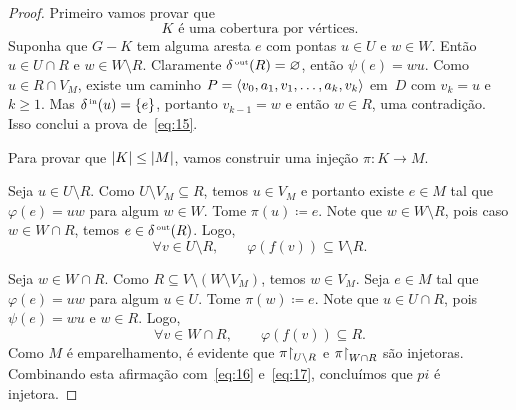 \documentclass[10pt,reqno]{amsart}
\begin{document}
\begin{proof}
  Primeiro vamos provar que
  \begin{equation}
    \label{eq:15}
    \text{\(K\) é uma cobertura por vértices.}
  \end{equation}
  Suponha que \(G - K\) tem alguma aresta \(e\) com pontas \(u \in U\)
  e \(w \in W\).  Então \(u \in U \cap R\) e \(w \in W \setminus R\).
  Claramente \(\delta_{}^{\scriptscriptstyle \rm\, out}(R) = \varnothing\), então \(\psi(e) = wu\).
  Como \(u \in R \cap V_M\), existe um caminho
  \(P = \langle v_0,a_1,v_1,\dotsc, a_k,v_k\rangle\) em~\(D\) com \(v_k = u\) e
  \(k \geq 1\).  Mas \(\delta_{}^{\scriptscriptstyle \rm\, in}(u) = \{e\}\), portanto
  \(v_{k-1} = w\) e então \(w \in R\), uma contradição.  Isso conclui
  a prova de~\eqref{eq:15}.

  Para provar que \(\lvert K\rvert \leq \lvert M\rvert\), vamos construir uma
  injeção \(\pi \colon K \to M\).

  Seja \(u \in U \setminus R\).  Como \(U \setminus V_M \subseteq R\),
  temos \(u \in V_M\) e portanto existe \(e \in M\) tal que
  \(\varphi(e) = uw\) para algum \(w \in W\).  Tome
  \(\pi(u) \coloneqq e\).  Note que \(w \in W \setminus R\), pois caso
  \(w \in W \cap R\), temos \(e \in \delta_{}^{\scriptscriptstyle \rm\, out}(R)\).  Logo,
  \begin{equation}
    \label{eq:16}
    \forall v \in U \setminus R,
    \qquad
    \varphi(f(v)) \subseteq V \setminus R.
  \end{equation}

  Seja \(w \in W \cap R\).  Como
  \(R \subseteq V \setminus (W \setminus V_M)\), temos \(w \in V_M\).
  Seja \(e \in M\) tal que \(\varphi(e) = uw\) para algum \(u \in U\).
  Tome \(\pi(w) \coloneqq e\).  Note que \(u \in U \cap R\), pois
  \(\psi(e) = wu\) e \(w \in R\).  Logo,
  \begin{equation}
    \label{eq:17}
    \forall v \in W \cap R,
    \qquad
    \varphi(f(v)) \subseteq R.
  \end{equation}
  Como \(M\) é emparelhamento, é evidente que
  \(\pi\mathord{\restriction}_{U \setminus R}\) e \(\pi\mathord{\restriction}_{W \cap R}\) são
  injetoras.  Combinando esta afirmação com~\eqref{eq:16}
  e~\eqref{eq:17}, concluímos que \(pi\) é injetora.
\end{proof}
\end{document}
